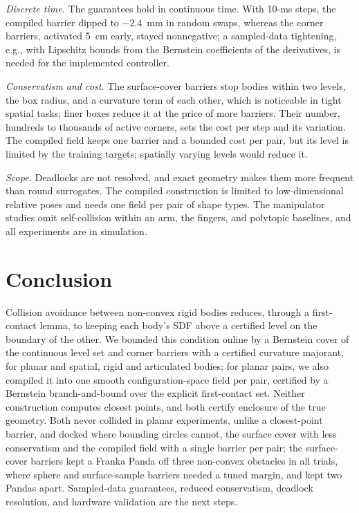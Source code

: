 \documentclass[journal]{IEEEtran}
\theoremstyle{definition}
\begin{document}
\emph{Discrete time.} The guarantees hold in continuous time. With 10-ms steps, the compiled barrier
dipped to $-2.4$~mm in random swaps, whereas the corner barriers, activated 5~cm early, stayed
nonnegative; a sampled-data tightening, e.g., with Lipschitz bounds from the Bernstein coefficients of
the derivatives, is needed for the implemented controller.

\emph{Conservatism and cost.} The surface-cover barriers stop bodies within two levels, the box
radius, and a curvature term of each other, which is noticeable in tight spatial tasks; finer boxes
reduce it at the price of more barriers. Their number, hundreds to thousands of active corners, sets
the cost per step and its variation. The compiled field keeps one barrier and a bounded cost per pair,
but its level is limited by the training targets; spatially varying levels would reduce it.

\emph{Scope.} Deadlocks are not resolved, and exact geometry makes them more frequent than round
surrogates. The compiled construction is limited to low-dimensional relative poses and needs one
field per pair of shape types. The manipulator studies omit self-collision within an arm, the
fingers, and polytopic baselines, and all experiments are in simulation.

\section{Conclusion}\label{sec:concl}
Collision avoidance between non-convex rigid bodies reduces, through a first-contact lemma, to
keeping each body's SDF above a certified level on the boundary of the other. We bounded this
condition online by a Bernstein cover of the continuous level set and corner barriers with a
certified curvature majorant, for planar and spatial, rigid and articulated bodies; for planar pairs,
we also compiled it into one smooth configuration-space field per pair, certified by a Bernstein
branch-and-bound over the explicit first-contact set. Neither construction computes closest points,
and both certify enclosure of the true geometry. Both never collided in planar experiments, unlike a
closest-point barrier, and docked where bounding circles cannot, the surface cover with less
conservatism and the compiled field with a single barrier per pair; the surface-cover barriers kept a
Franka Panda off three non-convex obstacles in all trials, where sphere and surface-sample barriers
needed a tuned margin, and kept two Pandas apart. Sampled-data guarantees, reduced conservatism,
deadlock resolution, and hardware validation are the next steps.



\end{document}

